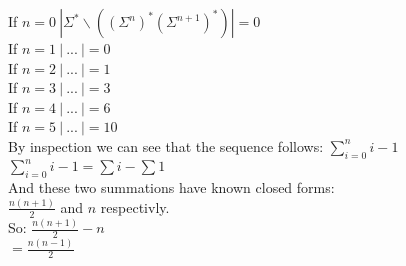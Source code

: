 \documentclass{article}
\begin{document}
\begin{enumerate}[a)]
    If $n=0\ |\Sigma^* \backslash ((\Sigma^n)^*(\Sigma^{n+1})^*)| = 0$ \\
    If $n=1\ |\ ...\ | = 0 $ \\
    If $n=2\ |\ ...\ | = 1 $ \\
    If $n=3\ |\ ...\ | = 3 $ \\
    If $n=4\ |\ ...\ | = 6 $ \\
    If $n=5\ |\ ...\ | = 10 $ \\

    By inspection we can see that the sequence follows: $\sum_{i=0}^n{i-1}$ \\[5pt]
    $\sum_{i=0}^n{i-1} = \sum{i} - \sum{1}$ \\[5pt]
    And these two summations have known closed forms: \\[5pt]
    $\frac{n(n+1)}{2}$ and $n$ respectivly.\\[5pt]
    So:
    $\frac{n(n+1)}{2} - n$\\
    $=\frac{n(n-1)}{2} $\\


    \end{enumerate}

    
\end{document}
